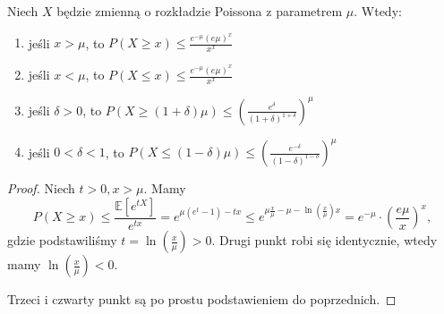 \begin{theorem}
	Niech \(X\) będzie zmienną o rozkładzie Poissona z parametrem \(\mu\). Wtedy:
	\begin{enumerate}
		\item jeśli \(x>\mu\), to \(P \left( X \ge x \right) \le \frac{e^{-\mu} \left( e\mu \right) ^{x}}{x^{x}}\)
		\item jeśli \(x < \mu\), to \(P \left( X \le x \right) \le \frac{e^{-\mu} \left( e\mu \right) ^{x}}{x^{x}}\)
		\item jeśli \(\delta > 0\), to \(P \left( X \ge \left( 1+\delta \right) \mu \right) \le \left( \frac{e^{\delta}}{ \left( 1+\delta \right) ^{1+\delta}} \right) ^{\mu}\)
		\item jeśli \(0 < \delta < 1\), to \(P \left( X \le \left( 1-\delta \right) \mu \right) \le \left( \frac{e^{-\delta}}{ \left( 1-\delta \right) ^{1-\delta}} \right) ^{\mu}\)
	\end{enumerate}
\end{theorem}
\begin{proof}
	Niech \(t>0, x>\mu\). Mamy \[ P \left( X\ge x \right) \le \frac{\mathbb{E} \left[ e^{tX} \right] }{e^{tx}} = e^{\mu \left( e^{t}-1 \right) -tx}  \le e^{\mu \frac{x}{\mu}- \mu-\ln \left( \frac{x}{\mu} \right) x} = e^{-\mu}\cdot \left( \frac{e\mu}{x} \right) ^{x} ,\]
	gdzie podstawiliśmy \(t= \ln \left( \frac{x}{\mu} \right) > 0 \). Drugi punkt robi się identycznie, wtedy mamy \(\ln \left( \frac{x}{\mu} \right) < 0\).

	Trzeci i czwarty punkt są po prostu podstawieniem do poprzednich.
\end{proof}

